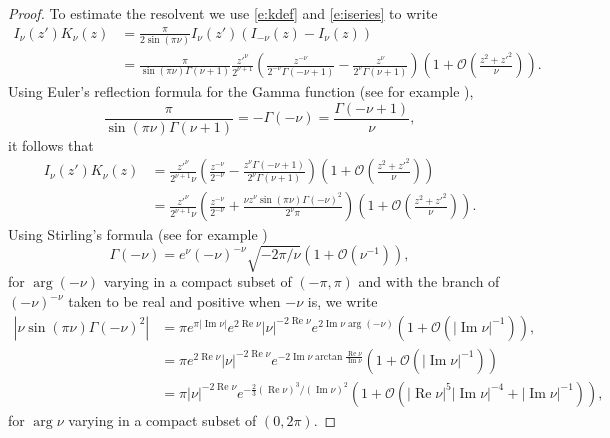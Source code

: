 \documentclass[reqno, 12pt]{amsart}
\newcommand \Oh {\mathcal{O}}
\DeclareMathOperator \re {Re}
\DeclareMathOperator \im {Im}
\theoremstyle{definition}
\numberwithin{equation}{section}
\numberwithin{prop}{section}
\numberwithin{figure}{section}
\begin{document}
\begin{proof}
To estimate the resolvent we use \eqref{e:kdef} and \eqref{e:iseries} to write
\[\begin{split}
I_\nu(z')K_\nu(z) &= \frac \pi {2\sin(\pi\nu)}I_\nu(z')(I_{-\nu}(z) - I_\nu(z)) \\
& =\frac \pi{\sin(\pi\nu)\Gamma(\nu+1)}  \frac {{z'}^\nu}{2^{\nu+1}}\left( \frac{z^{-\nu}}{2^{-\nu} \Gamma(-\nu+1)} -  \frac{z^\nu}{2^\nu \Gamma(\nu+1)}\right)\left(1 + \Oh\left(\frac{z^2 + {z'}^2}{\nu}\right)\right).
\end{split}\]
Using Euler's reflection formula for the Gamma function (see for example \cite[Chapter 2, (1.07)]{Olver:Asymptotics}),
\[\frac \pi{\sin(\pi\nu)\Gamma(\nu+1)} =  -\Gamma(-\nu) = \frac{\Gamma(-\nu+1)}\nu,\]
it follows that
\begin{equation}\label{e:ikprod}\begin{split}
I_\nu(z')K_\nu(z) &= \frac {{z'}^\nu}{2^{\nu+1}\nu}\left( \frac{z^{-\nu}}{2^{-\nu}} -  \frac{z^\nu\Gamma(-\nu+1)}{2^\nu \Gamma(\nu+1)}\right)\left(1 + \Oh\left(\frac{z^2 + {z'}^2}{\nu}\right)\right) \\
&= \frac {{z'}^\nu}{2^{\nu+1}\nu}\left( \frac{z^{-\nu}}{2^{-\nu}} +  \frac{\nu z^\nu\sin(\pi\nu)\Gamma(-\nu)^2}{2^\nu \pi}\right)\left(1 + \Oh\left(\frac{z^2 + {z'}^2}{\nu}\right)\right).
\end{split}\end{equation}
Using Stirling's formula (see for example \cite[Chapter 8, (4.04)]{Olver:Asymptotics})
\[
\Gamma(-\nu) = e^\nu (-\nu)^{-\nu}\sqrt{-2\pi/\nu} (1 + \Oh(\nu^{-1})),
\]
for $\arg (- \nu)$ varying in a compact subset of $(-\pi,\pi)$ and with the branch of $ (-\nu)^{-\nu}$ taken to be real and positive when $-\nu$ is, we write
\[\begin{split}
|\nu\sin(\pi\nu)\Gamma(-\nu)^2| %
& =  \pi e^{\pi|\im\nu|} e^{2\re\nu} |\nu|^{-2\re \nu} e^{2\im\nu \arg(-\nu)} (1+ \Oh(|\im \nu|^{-1})),\\
&= \pi  e^{2\re\nu} |\nu|^{-2\re \nu} e^{-2\im\nu \arctan\frac{\re\nu}{\im\nu}}(1+ \Oh(|\im \nu|^{-1}))\\
&=  \pi  |\nu|^{-2\re \nu} e^{-\frac 23 (\re \nu)^3/(\im \nu)^2}(1+ \Oh(|\re\nu|^5|\im\nu|^{-4} +  |\im \nu|^{-1})),
\end{split}\]
for $\arg \nu$ varying in a compact subset of $(0,2\pi)$.

\end{proof}
\end{document}
